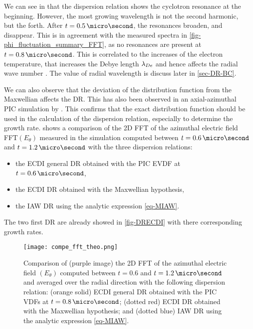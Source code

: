     We can see in  that the dispersion relation shows the cyclotron resonance at the beginning.
    However, the most growing wavelength is not the second harmonic, but the forth.
    After $t=0.5\,\micro\second$, the resonances broaden, and disappear.
    This is in agreement with the measured spectra in \cref{fig-phi_fluctuation_summary_FFT}, as no resonances are present at $t=0.8\,\micro\second$.
    This is correlated to the increases of the electron temperature, that increases the Debye length $\lambda_{De}$ and hence affects the radial wave number \citep{lafleur2016a,ducrocq2006,cavalier2013}.
    The value of radial wavelength is discuss later in \cref{sec-DR-BC}.
    
    
    We can also observe that the deviation of the distribution function from the Maxwellian affects the \ac{DR}.
    This has also been observed in an axial-azimuthal \ac{PIC} simulation by \citet{lafleur2018}.
    This confirms that the exact distribution function should be used in the calculation of the dispersion relation, especially to determine the growth rate.
     shows a comparison of the \ac{2D} \ac{FFT} of the azimuthal electric field FFT$(E_{\theta})$ measured in the simulation computed between  $t=0.6\,\micro\second$ and $t=1.2\,\micro\second$  with the three dispersion relations\string:
    \begin{itemize}
      \item the \ac{ECDI} general \ac{DR} obtained with the \ac{PIC} \ac{EVDF} at $t=0.6\,\micro\second$,
      \item the \ac{ECDI} \ac{DR} obtained with the Maxwellian hypothesis,
      \item the \ac{IAW} \ac{DR} using the analytic expression \cref{eq-MIAW}. 
    \end{itemize}
    The two first \ac{DR} are already showed in \cref{fig-DRECDI} with there corresponding growth rates.

    \begin{figure}[!hbt]
      \centering
      \texttt{[image: compe\_fft\_theo.png]}
      \caption{Comparison of (purple image) the \acs{2D} \acs{FFT} of the azimuthal electric field $(E_{\theta})$ computed between  $t=0.6$ and $t=1.2\,\micro\second$ and averaged over the radial direction with the following dispersion relation\string: (orange solid) \acs{ECDI} general \acs{DR} obtained with the \acs{PIC} VDFs at $t=0.8\,\micro\second$; (dotted red) \acs{ECDI} \acs{DR} obtained with the Maxwellian hypothesis; and (dotted blue) \acs{IAW} \acs{DR} using the analytic expression \cref{eq-MIAW}.   }
      \label{fig-DR_and_fft}
    \end{figure}
    
